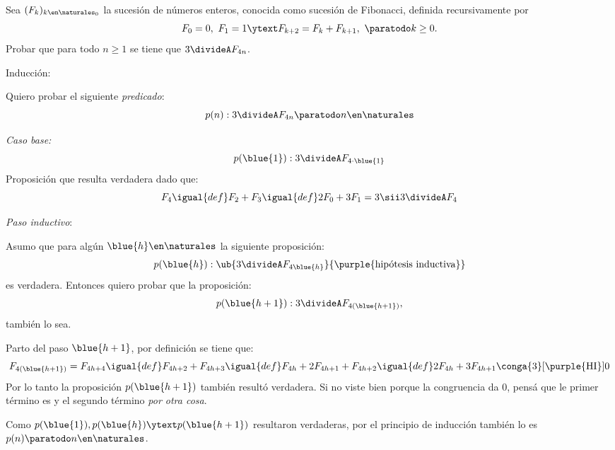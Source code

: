 \begin{enunciado}{\ejExtra}
  Sea $(F_k)_{k\en \naturales_0}$ la sucesión de números enteros, conocida como sucesión de Fibonacci,
  definida recursivamente por
  $$
    F_0 = 0,~ F_1= 1
    \ytext
    F_{k+2} = F_k + F_{k+1},~ \paratodo k \geq 0 .
  $$
  Probar que para todo $n \geq 1$ se tiene que $3 \divideA F_{4n}$.
\end{enunciado}

Inducción:

Quiero probar el siguiente \textit{predicado}:
$$
  p(n) : 3 \divideA F_{4n} \paratodo n \en \naturales
$$

\textit{Caso base:}
$$
  p(\blue{1}) : 3 \divideA F_{4 \cdot \blue{1}}
$$
Proposición que resulta verdadera dado que:
$$
  F_4 \igual{def}
  F_2 + F_3 \igual{def}
  2F_0 + 3F_1 = 3
  \sii
  3 \divideA F_4
$$

\textit{Paso inductivo}:

Asumo que para algún $\blue{h} \en \naturales$ la siguiente proposición:
$$
  p(\blue{h}) :
  \ub{
    3 \divideA F_{4\blue{h}}
  }{
    \text{\purple{hipótesis inductiva}}
  }
$$
es verdadera. Entonces quiero probar que la proposición:
$$
  p(\blue{h+1}) : 3 \divideA F_{4(\blue{h+1})},
$$
también lo sea.

\medskip

Parto del paso $\blue{h+1}$, por definición se tiene que:
$$
  F_{4(\blue{h+1})} =
  F_{4h+4} \igual{def}
  F_{4h+2} + F_{4h+3} \igual{def}
  F_{4h} + 2F_{4h+1} + F_{4h+2} \igual{def}
  2F_{4h} + 3F_{4h+1} \conga{3}[\text{\purple{HI}}] 0
$$
Por lo tanto la proposición $p(\blue{h+1})$ también resultó verdadera. Si no viste bien porque la congruencia da 0, pensá que le primer
término es \textit{} y el segundo término \textit{por otra cosa}.

\bigskip

Como $p(\blue{1}), p(\blue{h}) \ytext p(\blue{h + 1})$ resultaron verdaderas, por el principio de inducción también
lo es $p(n) \paratodo n \en \naturales$.

\begin{aportes}
  \item {}
\end{aportes}
